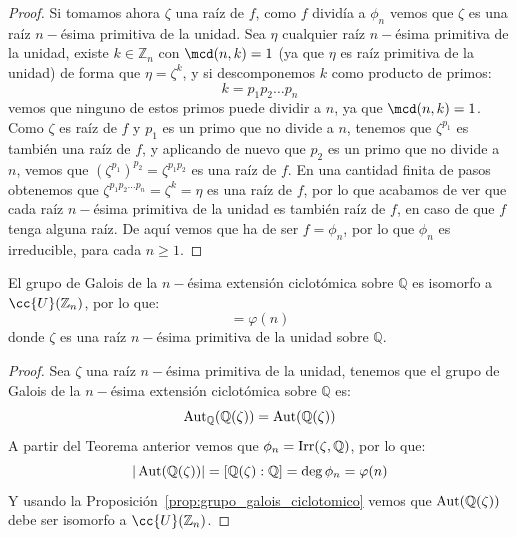 \begin{teo}
\begin{proof}
        \noindent
        Si tomamos ahora $\zeta$ una raíz de $f$, como $f$ dividía a $\phi_n$ vemos que $\zeta$ es una raíz $n-$ésima primitiva de la unidad. Sea $\eta$ cualquier raíz $n-$ésima primitiva de la unidad, existe $k \in \mathbb{Z}_n$ con $\mcd(n,k)=1$ (ya que $\eta$ es raíz primitiva de la unidad) de forma que $\eta = \zeta^k$, y si descomponemos $k$ como producto de primos:
        \begin{equation*}
            k = p_1 p_2 \ldots p_n
        \end{equation*}
        vemos que ninguno de estos primos puede dividir a $n$, ya que $\mcd(n,k)=1$. Como $\zeta$ es raíz de $f$ y $p_1$ es un primo que no divide a $n$, tenemos que $\zeta^{p_1}$ es también una raíz de $f$, y aplicando de nuevo que $p_2$ es un primo que no divide a $n$, vemos que ${(\zeta^{p_1})}^{p_2} = \zeta^{p_1p_2}$ es una raíz de $f$. En una cantidad finita de pasos obtenemos que $\zeta^{p_1p_2 \ldots p_n} = \zeta^k = \eta$ es una raíz de $f$, por lo que acabamos de ver que cada raíz $n-$ésima primitiva de la unidad es también raíz de $f$, en caso de que $f$ tenga alguna raíz. De aquí vemos que ha de ser $f = \phi_n$, por lo que $\phi_n$ es irreducible, para cada $n\geq 1$.
    \end{proof}
\end{teo}

\begin{coro}
    El grupo de Galois de la $n-$ésima extensión ciclotómica sobre $\mathbb{Q}$ es isomorfo a $\cc{U}(\mathbb{Z}_n)$, por lo que:
    \begin{equation*}
        [\mathbb{Q}(\zeta):\mathbb{Q}] = \varphi(n)
    \end{equation*}
    donde $\zeta$ es una raíz $n-$ésima primitiva de la unidad sobre $\mathbb{Q}$.
    \begin{proof}
        Sea $\zeta$ una raíz $n-$ésima primitiva de la unidad, tenemos que el grupo de Galois de la $n-$ésima extensión ciclotómica sobre $\mathbb{Q}$ es:
        \begin{equation*}
            \operatorname{Aut}_\mathbb{Q}(\mathbb{Q}(\zeta)) = \operatorname{Aut}(\mathbb{Q}(\zeta))
        \end{equation*}
        A partir del Teorema anterior vemos que $\phi_n = \operatorname{Irr}(\zeta,\mathbb{Q})$, por lo que:
        \begin{equation*}
            |\operatorname{Aut}(\mathbb{Q}(\zeta))| = [\mathbb{Q}(\zeta):\mathbb{Q}] = \deg \phi_n = \varphi(n)
        \end{equation*}
        Y usando la Proposición~\ref{prop:grupo_galois_ciclotomico} vemos que $\operatorname{Aut}(\mathbb{Q}(\zeta))$ debe ser isomorfo a $\cc{U}(\mathbb{Z}_n)$.
    \end{proof}
\end{coro}

